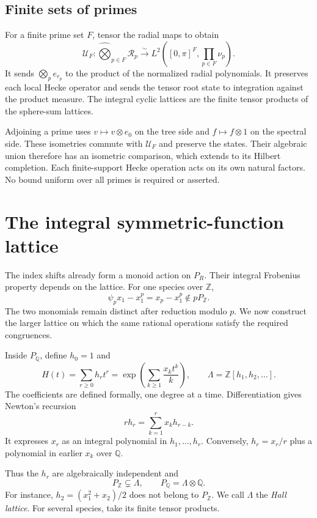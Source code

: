 \subsection{Finite sets of primes}

For a finite prime set $F$, tensor the radial maps to obtain
\[
 \mathcal U_F:\widehat\bigotimes_{p\in F}\mathcal R_p
 \xrightarrow{\sim}
 L^2\left([0,\pi]^F,\prod_{p\in F}\nu_p\right).
\]
It sends $\bigotimes_pe_{r_p}$ to the product of the normalized
radial polynomials. It preserves each local Hecke operator and
sends the tensor root state to integration against the product measure.
The integral cyclic lattices are the finite tensor products of
the sphere-sum lattices.

Adjoining a prime uses $v\mapsto v\otimes e_0$ on the tree side
and $f\mapsto f\otimes1$ on the spectral side.
These isometries commute with $\mathcal U_F$ and preserve the states.
Their algebraic union therefore has an isometric comparison,
which extends to its Hilbert completion.
Each finite-support Hecke operation acts on its own natural factors.
No bound uniform over all primes is required or asserted.

\section{The integral symmetric-function lattice}
\label{v4-arith:hecke:sec:lambda}

The index shifts already form a monoid action on $P_R$.
Their integral Frobenius property depends on the lattice.
For one species over $\mathbb Z$,
\[
 \psi_px_1-x_1^p=x_p-x_1^p\notin pP_{\mathbb Z}.
\]
The two monomials remain distinct after reduction modulo $p$.
We now construct the larger lattice on which the same rational
operations satisfy the required congruences.

Inside $P_{\mathbb Q}$, define $h_0=1$ and
\begin{equation}
 \label{v4-arith:hecke:eq:complete-series}
 H(t)=\sum_{r\geq0}h_rt^r
 =\exp\left(\sum_{k\geq1}\frac{x_kt^k}{k}\right),\qquad
 \Lambda=\mathbb Z[h_1,h_2,\ldots].
\end{equation}
The coefficients are defined formally, one degree at a time.
Differentiation gives Newton's recursion
\[
 rh_r=\sum_{k=1}^rx_kh_{r-k}.
\]
It expresses $x_r$ as an integral polynomial in $h_1,\ldots,h_r$.
Conversely, $h_r=x_r/r$ plus a polynomial in earlier $x_k$ over $\mathbb Q$.

Thus the $h_r$ are algebraically independent and
\[
 P_{\mathbb Z}\subsetneq\Lambda,\qquad
 P_{\mathbb Q}=\Lambda\otimes\mathbb Q.
\]
For instance, $h_2=(x_1^2+x_2)/2$ does not belong to $P_{\mathbb Z}$.
We call $\Lambda$ the \emph{Hall lattice}.
For several species, take its finite tensor products.

